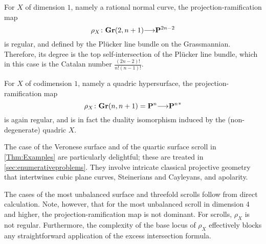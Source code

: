\documentclass[11pt,reqno]{amsart}
\theoremstyle{plain}
\theoremstyle{definition}
\theoremstyle{remark}
\numberwithin{equation}{section}
\renewcommand{\to}{{\longrightarrow}}
\numberwithin{equation}{section}
\begin{document}
For $X$ of dimension $1$, namely a rational normal curve, the projection-ramification map
\[ \rho_X \from \Gr(2, n+1) \to \P^{2n-2}\]
is regular, and defined by the Pl\"ucker line bundle on the Grassmannian.
Therefore, its degree is the top self-intersection of the Pl\"ucker line bundle, which in this case is the Catalan number $\frac{(2n-2)!}{n!(n-1)!}$.

For $X$ of codimension $1$, namely a quadric hypersurface, the projection-ramification map
\[ \rho_X \from \Gr(n, n+1) = \P^{n} \to {\P^n}^* \]
is again regular, and is in fact the duality isomorphism induced by the (non-degenerate) quadric $X$.

The case of the Veronese surface and of the quartic surface scroll in \autoref{Thm:Examples} are particularly delightful; these are treated in \autoref{sec:enumerativeproblems}.
They involve intricate classical projective geometry that intertwines cubic plane curves, Steinerians and Cayleyans, and apolarity.

The cases of the most unbalanced surface and threefold scrolls follow from direct calculation.
Note, however, that for the most unbalanced scroll in dimension 4 and higher, the projection-ramification map is not dominant.
For scrolls, $\rho_X$ is not regular.
Furthermore, the complexity of the base locus of $\rho_X$ effectively blocks any straightforward application of the excess intersection formula.
\end{document}
